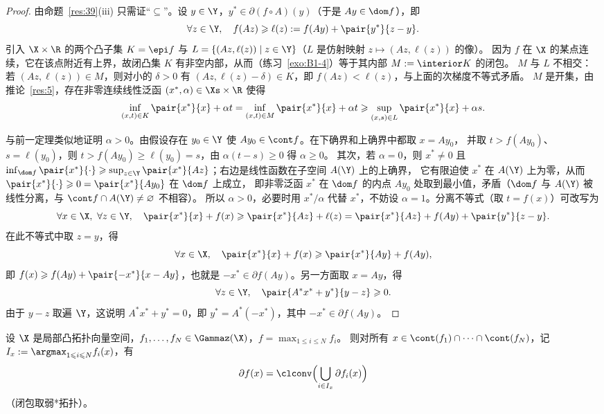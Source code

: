 \begin{proof}
由命题~\ref{res:39}(iii) 只需证“$\subseteq$”。设 $y\in\Y$，$y^*\in\partial(f\circ A)(y)$（于是 $Ay\in\dom f$），即
\[
  \forall z\in\Y,\quad f(Az)\geqslant\ell(z):=f(Ay)+\pair{y^*}{z-y}.
\]
引入 $\X\times\R$ 的两个凸子集 $K=\epi f$ 与 $L=\{(Az,\ell(z))\mid z\in\Y\}$（$L$ 是仿射映射 $z\mapsto(Az,\ell(z))$ 的像）。
因为 $f$ 在 $\X$ 的某点连续，它在该点附近有上界，故闭凸集 $K$ 有非空内部，从而（练习~\ref{exo:B1-4}）等于其内部 $M:=\interior K$ 的闭包。
$M$ 与 $L$ 不相交：若 $(Az,\ell(z))\in M$，则对小的 $\delta>0$ 有 $(Az,\ell(z)-\delta)\in K$，即 $f(Az)<\ell(z)$，与上面的次梯度不等式矛盾。
$M$ 是开集，由推论~\ref{res:5}，存在非零连续线性泛函 $(x^*,\alpha)\in\Xs\times\R$ 使得
\[
  \inf_{(x,t)\in K}\pair{x^*}{x}+\alpha t=\inf_{(x,t)\in M}\pair{x^*}{x}+\alpha t\geqslant\sup_{(x,s)\in L}\pair{x^*}{x}+\alpha s .
\]

与前一定理类似地证明 $\alpha>0$。由假设存在 $y_0\in\Y$ 使 $Ay_0\in\cont f$。在下确界和上确界中都取 $x=Ay_0$，
并取 $t>f(Ay_0)$、$s=\ell(y_0)$，则 $t>f(Ay_0)\geqslant\ell(y_0)=s$，由 $\alpha(t-s)\geqslant0$ 得 $\alpha\geqslant0$。
其次，若 $\alpha=0$，则 $x^*\neq0$ 且 $\inf_{\dom f}\pair{x^*}{\cdot}\geqslant\sup_{z\in\Y}\pair{x^*}{Az}$；右边是线性函数在子空间 $A(\Y)$ 上的上确界，
它有限迫使 $x^*$ 在 $A(\Y)$ 上为零，从而 $\pair{x^*}{\cdot}\geqslant0=\pair{x^*}{Ay_0}$ 在 $\dom f$ 上成立，
即非零泛函 $x^*$ 在 $\dom f$ 的内点 $Ay_0$ 处取到最小值，矛盾（$\dom f$ 与 $A(\Y)$ 被线性分离，与 $\cont f\cap A(\Y)\neq\varnothing$ 不相容）。
所以 $\alpha>0$，必要时用 $x^*/\alpha$ 代替 $x^*$，不妨设 $\alpha=1$。分离不等式（取 $t=f(x)$）可改写为
\[
  \forall x\in\X,\ \forall z\in\Y,\quad\pair{x^*}{x}+f(x)\geqslant\pair{x^*}{Az}+\ell(z)=\pair{x^*}{Az}+f(Ay)+\pair{y^*}{z-y}.
\]
在此不等式中取 $z=y$，得
\[
  \forall x\in\X,\quad\pair{x^*}{x}+f(x)\geqslant\pair{x^*}{Ay}+f(Ay),
\]
即 $f(x)\geqslant f(Ay)+\pair{-x^*}{x-Ay}$，也就是 $-x^*\in\partial f(Ay)$。另一方面取 $x=Ay$，得
\[
  \forall z\in\Y,\quad\pair{A^*x^*+y^*}{y-z}\geqslant0 .
\]
由于 $y-z$ 取遍 $\Y$，这说明 $A^*x^*+y^*=0$，即 $y^*=A^*(-x^*)$，其中 $-x^*\in\partial f(Ay)$。
\end{proof}

\begin{theorem}
\label{res:42}
设 $\X$ 是局部凸拓扑向量空间，$f_1,\dots,f_N\in\Gammaz(\X)$，$f=\max_{1\leqslant i\leqslant N}f_i$。
则对所有 $x\in\cont(f_1)\cap\dots\cap\cont(f_N)$，记 $I_x:=\argmax_{1\leqslant i\leqslant N}f_i(x)$，有
\[
  \partial f(x)=\clconv\Bigl(\bigcup_{i\in I_x}\partial f_i(x)\Bigr)
\]
（闭包取弱*拓扑）。
\end{theorem}


